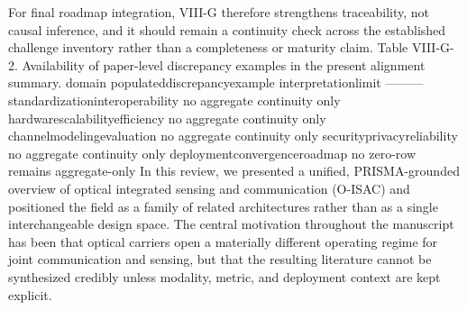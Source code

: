 {}For final roadmap integration, VIII-G therefore strengthens traceability, not causal inference, and it should remain a continuity check across the established challenge inventory rather than a completeness or maturity claim.\markdownRendererParagraphSeparator
{}Table VIII-G-2. Availability of paper-level discrepancy examples in the present alignment summary.\markdownRendererParagraphSeparator
{}\markdownRendererPipe{} domain \markdownRendererPipe{} populated\markdownRendererUnderscore{}discrepancy\markdownRendererUnderscore{}example \markdownRendererPipe{} interpretation\markdownRendererUnderscore{}limit \markdownRendererPipe{}\markdownRendererSoftLineBreak
{}\markdownRendererPipe{}---\markdownRendererPipe{}---\markdownRendererPipe{}---\markdownRendererPipe{}\markdownRendererSoftLineBreak
{}\markdownRendererPipe{} standardization\markdownRendererUnderscore{}interoperability \markdownRendererPipe{} no \markdownRendererPipe{} aggregate continuity only \markdownRendererPipe{}\markdownRendererSoftLineBreak
{}\markdownRendererPipe{} hardware\markdownRendererUnderscore{}scalability\markdownRendererUnderscore{}efficiency \markdownRendererPipe{} no \markdownRendererPipe{} aggregate continuity only \markdownRendererPipe{}\markdownRendererSoftLineBreak
{}\markdownRendererPipe{} channel\markdownRendererUnderscore{}modeling\markdownRendererUnderscore{}evaluation \markdownRendererPipe{} no \markdownRendererPipe{} aggregate continuity only \markdownRendererPipe{}\markdownRendererSoftLineBreak
{}\markdownRendererPipe{} security\markdownRendererUnderscore{}privacy\markdownRendererUnderscore{}reliability \markdownRendererPipe{} no \markdownRendererPipe{} aggregate continuity only \markdownRendererPipe{}\markdownRendererSoftLineBreak
{}\markdownRendererPipe{} deployment\markdownRendererUnderscore{}convergence\markdownRendererUnderscore{}roadmap \markdownRendererPipe{} no \markdownRendererPipe{} zero-row remains aggregate-only \markdownRendererPipe{}\markdownRendererInterblockSeparator
{}
\markdownRendererSectionEnd 
\markdownRendererSectionEnd \markdownRendererSectionBegin
{}\markdownRendererInterblockSeparator
{}In this review, we presented a unified, PRISMA-grounded overview of optical integrated sensing and communication (O-ISAC) and positioned the field as a family of related architectures rather than as a single interchangeable design space. The central motivation throughout the manuscript has been that optical carriers open a materially different operating regime for joint communication and sensing, but that the resulting literature cannot be synthesized credibly unless modality, metric, and deployment context are kept explicit.\markdownRendererParagraphSeparator
